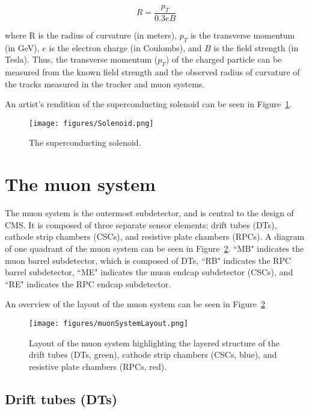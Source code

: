 \begin{equation}
R = \frac{p_{T}}{0.3eB}
\end{equation}

\noindent where R is the radius of curvature (in meters), $p_{T}$ is the transverse momentum (in GeV), $e$ is the electron charge (in Coulombs), and $B$ is the field strength (in Tesla). Thus, the transverse momentum ($p_{T}$) of the charged particle can be measured from the known field strength and the observed radius of curvature of the tracks measured in the tracker and muon systems.

An artist's rendition of the superconducting solenoid can be seen in Figure~\ref{fig:Solenoid}.

\begin{figure}\centering
  \texttt{[image: figures/Solenoid.png]}
  \caption{\label{fig:Solenoid} The superconducting solenoid.}
\end{figure}

\section{The muon system}

The muon system is the outermost subdetector, and is central to the design of CMS. It is composed of three separate sensor elements: drift tubes (DTs), cathode strip chambers (CSCs), and resistive plate chambers (RPCs). A diagram of one quadrant of the muon system can be seen in Figure~\ref{fig:muonSystemLayout}. ``MB" indicates the muon barrel subdetector, which is composed of DTs, ``RB" indicates the RPC barrel subdetector, ``ME" indicates the muon endcap subdetector (CSCs), and ``RE" indicates the RPC endcap subdetector. 

An overview of the layout of the muon system can be seen in Figure~\ref{fig:muonSystemLayout}

\begin{figure}\centering
  \texttt{[image: figures/muonSystemLayout.png]}
  \caption{\label{fig:muonSystemLayout} Layout of the muon system highlighting the layered structure of the drift tubes (DTs, green), cathode strip chambers (CSCs, blue), and resistive plate chambers (RPCs, red).}
\end{figure}

\subsection{Drift tubes (DTs)}

